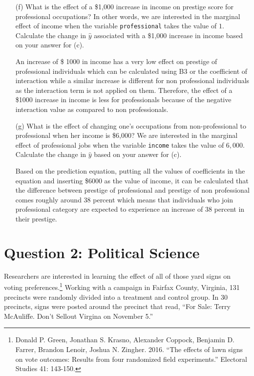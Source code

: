 \documentclass[12pt,letterpaper]{article}
\begin{document}
\begin{enumerate}
	\vspace{2cm}
	\item [(f)]
	What is the effect of a \$1,000 increase in income on prestige score for professional occupations? In other words, we are interested in the marginal effect of income when the variable \texttt{professional} takes the value of $1$. Calculate the change in $\hat{y}$ associated with a \$1,000 increase in income based on your answer for (c).
	\item[]An increase of  \$ 1000 in income has a very low effect on prestige of professional individuals which can be calculated using B3 or the coefficient of interaction while a similar increase is different for non professional individuals as the
	interaction term is not applied on them. Therefore, the effect of a \$1000 
	increase in income is less for professionals because of the negative interaction
	value as compared to non professionals.
	
	
	
	\vspace{2cm}
	\item [(g)]
	What is the effect of changing one's occupations from non-professional to professional when her income is \$6,000? We are interested in the marginal effect of professional jobs when the variable \texttt{income} takes the value of $6,000$. Calculate the change in $\hat{y}$ based on your answer for (c).
	
	\item[] Based on the prediction equation, putting all the values of coefficients
	in the equation and inserting \$6000 as the value of income, it can be 
	calculated that the difference between prestige of professional and 
	prestige of non professional comes roughly around 38 percent which means that
	individuals who join professional category are expected to experience an
	increase of 38 percent in their prestige.
	
\end{enumerate}

\newpage

\section*{Question 2: Political Science}
\vspace{.25cm}
\noindent 	Researchers are interested in learning the effect of all of those yard signs on voting preferences.\footnote{Donald P. Green, Jonathan	S. Krasno, Alexander Coppock, Benjamin D. Farrer,	Brandon Lenoir, Joshua N. Zingher. 2016. ``The effects of lawn signs on vote outcomes: Results from four randomized field experiments.'' Electoral Studies 41: 143-150. } Working with a campaign in Fairfax County, Virginia, 131 precincts were randomly divided into a treatment and control group. In 30 precincts, signs were posted around the precinct that read, ``For Sale: Terry McAuliffe. Don't Sellout Virgina on November 5.'' \\
\end{document}
